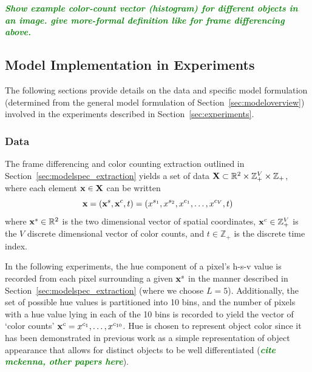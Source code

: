 \documentclass[smallcondensed, final]{svjour3}
\newcommand{\willie}[1]{\textcolor{green}{\textsf{\emph{\textbf{\textcolor{green}{#1}}}}}}
\begin{document}
\willie{Show example color-count vector (histogram) for different objects in an image. give more-formal definition like for frame differencing above.}







\subsection{Model Implementation in Experiments}

The following sections provide details on the data and specific model formulation (determined from the general model formulation of Section~\ref{sec:modeloverview}) involved in the experiments described in Section~\ref{sec:experiments}.


\subsubsection{Data}

The frame differencing and color counting extraction outlined in Section~\ref{sec:modelspec_extraction} yields a set of data $\bold{X} \subset \mathbb{R}^{2} \times \mathbb{Z}_{+}^{V} \times \mathbb{Z}_{+}$, where each element $\bold{x} \in \bold{X}$ can be written
\begin{equation}
\bold{x} = ( \bold{x}^{s}, \bold{x}^{c}, t ) = ( x^{s_{1}}, x^{s_{2}}, x^{c_{1}}, \ldots, x^{c_{V}}, t )
\end{equation}
where $\bold{x}^{s} \in \mathbb{R}^{2}$ is the two dimensional vector of spatial coordinates,  $\bold{x}^{c} \in \mathbb{Z}_{+}^{V}$ is the $V$ discrete dimensional vector of color counts, and $t \in \mathbb{Z}_{+}$ is the discrete time index. 

In the following experiments, the hue component of a pixel's h-s-v value is recorded from each pixel surrounding a given $\bold{x}^{s}$ in the manner described in Section~\ref{sec:modelspec_extraction} (where we choose $L=5$). Additionally, the set of possible hue values is partitioned into 10 bins, and the number of pixels with a hue value lying in each of the 10 bins is recorded to yield the vector of `color counts' $\bold{x}^{c} = x^{c_{1}}, \ldots, x^{c_{10}}$. Hue is chosen to represent object color since it has been demonstrated in previous work as a simple representation of object appearance that allows for distinct objects to be well differentiated (\willie{cite mckenna, other papers here}).
\end{document}
